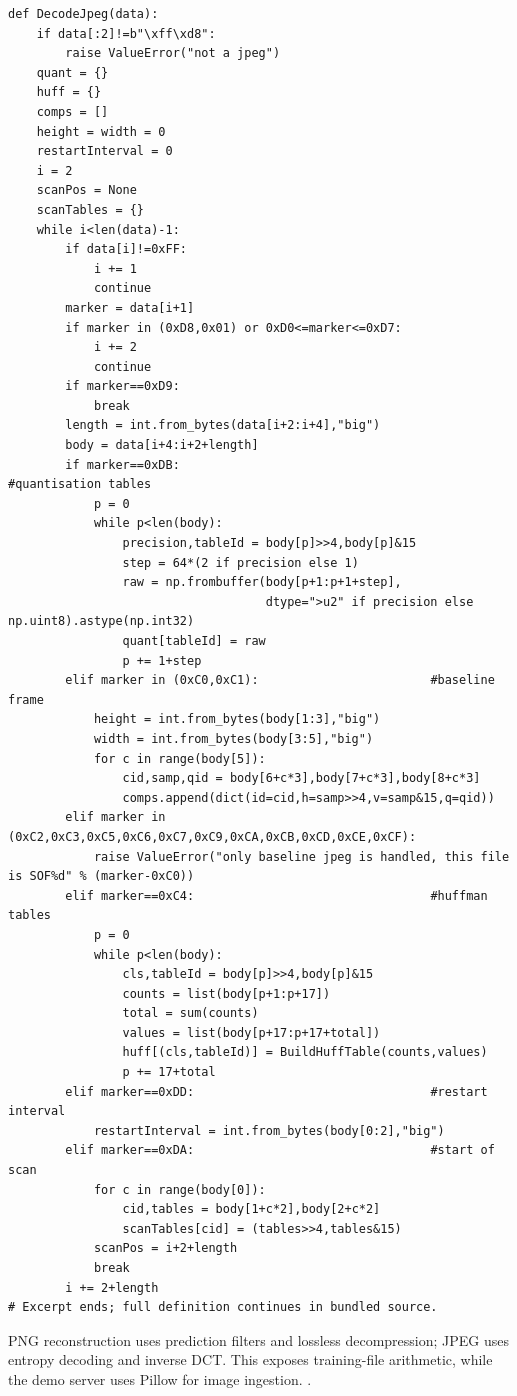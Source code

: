 \begin{lstlisting}[style=plain]
def DecodeJpeg(data):
    if data[:2]!=b"\xff\xd8":
        raise ValueError("not a jpeg")
    quant = {}
    huff = {}
    comps = []
    height = width = 0
    restartInterval = 0
    i = 2
    scanPos = None
    scanTables = {}
    while i<len(data)-1:
        if data[i]!=0xFF:
            i += 1
            continue
        marker = data[i+1]
        if marker in (0xD8,0x01) or 0xD0<=marker<=0xD7:
            i += 2
            continue
        if marker==0xD9:
            break
        length = int.from_bytes(data[i+2:i+4],"big")
        body = data[i+4:i+2+length]
        if marker==0xDB:                                   #quantisation tables
            p = 0
            while p<len(body):
                precision,tableId = body[p]>>4,body[p]&15
                step = 64*(2 if precision else 1)
                raw = np.frombuffer(body[p+1:p+1+step],
                                    dtype=">u2" if precision else np.uint8).astype(np.int32)
                quant[tableId] = raw
                p += 1+step
        elif marker in (0xC0,0xC1):                        #baseline frame
            height = int.from_bytes(body[1:3],"big")
            width = int.from_bytes(body[3:5],"big")
            for c in range(body[5]):
                cid,samp,qid = body[6+c*3],body[7+c*3],body[8+c*3]
                comps.append(dict(id=cid,h=samp>>4,v=samp&15,q=qid))
        elif marker in (0xC2,0xC3,0xC5,0xC6,0xC7,0xC9,0xCA,0xCB,0xCD,0xCE,0xCF):
            raise ValueError("only baseline jpeg is handled, this file is SOF%d" % (marker-0xC0))
        elif marker==0xC4:                                 #huffman tables
            p = 0
            while p<len(body):
                cls,tableId = body[p]>>4,body[p]&15
                counts = list(body[p+1:p+17])
                total = sum(counts)
                values = list(body[p+17:p+17+total])
                huff[(cls,tableId)] = BuildHuffTable(counts,values)
                p += 17+total
        elif marker==0xDD:                                 #restart interval
            restartInterval = int.from_bytes(body[0:2],"big")
        elif marker==0xDA:                                 #start of scan
            for c in range(body[0]):
                cid,tables = body[1+c*2],body[2+c*2]
                scanTables[cid] = (tables>>4,tables&15)
            scanPos = i+2+length
            break
        i += 2+length
# Excerpt ends; full definition continues in bundled source.
\end{lstlisting}
PNG reconstruction uses prediction filters and lossless decompression; JPEG uses entropy decoding and inverse DCT. This exposes training-file arithmetic, while the demo server uses Pillow for image ingestion. \cite{pngspec,jpegspec,pillowimage}.


